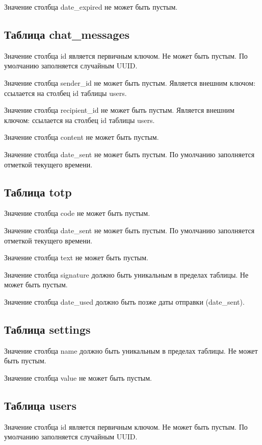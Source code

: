 Значение столбца date\_expired не может быть пустым.

\subsection{Таблица chat\_messages}

Значение столбца id является первичным ключом. Не может быть пустым. По умолчанию заполняется случайным UUID.

Значение столбца sender\_id не может быть пустым. Является внешним ключом: ссылается на столбец id таблицы users.

Значение столбца recipient\_id не может быть пустым. Является внешним ключом: ссылается на столбец id таблицы users.

Значение столбца content не может быть пустым.

Значение столбца date\_sent не может быть пустым. По умолчанию заполняется отметкой текущего времени.

\subsection{Таблица totp}

Значение столбца code не может быть пустым.

Значение столбца date\_sent не может быть пустым. По умолчанию заполняется отметкой текущего времени.

Значение столбца text не может быть пустым.

Значение столбца signature должно быть уникальным в пределах таблицы. Не может быть пустым.

Значение столбца date\_used должно быть позже даты отправки (date\_sent).

\subsection{Таблица settings}

Значение столбца name должно быть уникальным в пределах таблицы. Не может быть пустым.

Значение столбца value не может быть пустым.

\subsection{Таблица users}

Значение столбца id является первичным ключом. Не может быть пустым. По умолчанию заполняется случайным UUID.

